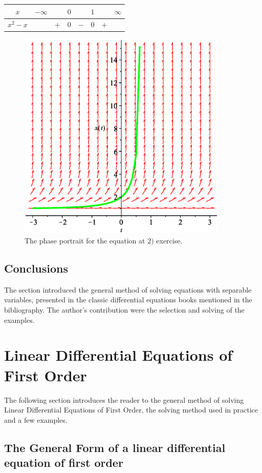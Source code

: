 \documentclass[a4paper,11pt]{report}
\begin{document}
\begin{center}
\begin{tabular}{c|c c c c c c c}
 $x$ & $-\infty$& & $0$ & &$1$ & &$\infty$\\
 \hline
 $x^{2}-x$ & &$+$& $0$& $-$& $0$ & $+$ &
\end{tabular}
\end{center}
\begin{figure}[h]
\caption{The phase portrait for the equation at $2)$ exercise.}
\centering
 \includegraphics[width=10cm]{PortretEVS.eps}
\end{figure}

\subsection{Conclusions}
The section introduced the general method of solving equations with separable variables, presented in the classic differential equations books mentioned in the bibliography. The author's contribution were the selection and solving of the examples.




\section{Linear Differential Equations of First Order}

The following section introduces the reader to the general method of solving Linear Differential Equations of First Order, the solving method used in practice and a few examples.

\subsection{The General Form of a linear differential equation of first order}
\end{document}
